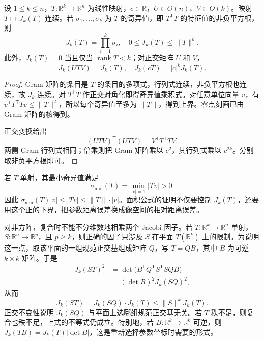 \begin{proposition}\label{b1:prop:linear-jacobian-properties}
设 \(1\le k\le n\)，\(T:\mathbb R^k\to\mathbb R^n\) 为线性映射，\(c\in\mathbb R\)，\(U\in O(n)\)、\(V\in O(k)\)。映射 \(T\mapsto J_k(T)\) 连续。若 \(\sigma_1,\ldots,\sigma_k\) 为 \(T\) 的奇异值，即 \(T^{\mathsf T}T\) 的特征值的非负平方根，则
\[
 J_k(T)=\prod_{i=1}^k\sigma_i,\quad
 0\leq J_k(T)\leq\|T\|^k.
\]
此外，\(J_k(T)=0\) 当且仅当 \(\operatorname{rank}T<k\)；对正交矩阵 \(U\) 和 \(V\)，
\[
 J_k(UTV)=J_k(T),\quad J_k(cT)=|c|^kJ_k(T).
\]
\end{proposition}
\begin{proof}
Gram 矩阵的条目是 \(T\) 的条目的多项式，行列式连续，非负平方根也连续，故 \(J_k\) 连续。对 \(T^{\mathsf T}T\) 作正交对角化即得奇异值乘积式。对任意单位向量 \(v\)，有 \(v^{\mathsf T}T^{\mathsf T}Tv\leq\|T\|^2\)，所以每个奇异值至多为 \(\|T\|\)，得到上界。零点刻画已由 Gram 矩阵的核得到。

正交变换给出
\[
 (UTV)^{\mathsf T}(UTV)=V^{\mathsf T}T^{\mathsf T}TV.
\]
两侧 Gram 行列式相同；倍乘则把 Gram 矩阵乘以 \(c^2\)，其行列式乘以 \(c^{2k}\)。分别取非负平方根即可。
\end{proof}

若 \(T\) 单射，其最小奇异值满足
\[
 \sigma_{\min}(T)=\min_{|v|=1}|Tv|>0.
\]
因此 \(\sigma_{\min}(T)|v|\leq|Tv|\leq\|T\|\cdot|v|\)。面积公式的证明不仅要控制 \(J_k(T)\)，还要用这个正的下界，把参数距离误差换成像空间的相对距离误差。

\ProseParagraphBreak

对非方阵，复合时不能不分维数地相乘两个 Jacobi 因子。若 \(T:\mathbb R^k\to\mathbb R^n\) 单射，\(S:\mathbb R^n\to\mathbb R^p\)，且 \(p\geq k\)，则正确的因子只涉及 \(S\) 在平面 \(T(\mathbb R^k)\) 上的限制。为说明这一点，取该平面的一组规范正交基组成矩阵 \(Q\)，写 \(T=QB\)，其中 \(B\) 为可逆 \(k\times k\) 矩阵。于是
\[
 \begin{aligned}
 J_k(ST)^2
 &=\det\bigl(B^{\mathsf T}Q^{\mathsf T}S^{\mathsf T}SQB\bigr)\\
 &=(\det B)^2J_k(SQ)^2,
 \end{aligned}
\]
从而
\begin{equation}\label{b1:eq:linear-jacobian-composition}
 J_k(ST)=J_k(SQ)\cdot J_k(T)
 \leq\|S\|^kJ_k(T).
\end{equation}
正交不变性说明 \(J_k(SQ)\) 与平面上选哪组规范正交基无关。若 \(T\) 秩不足，则复合也秩不足，上式的不等式仍成立。特别地，若 \(B:\mathbb R^k\to\mathbb R^k\) 可逆，则 \(J_k(TB)=J_k(T)|\det B|\)，这是重新选择参数坐标时需要的形式。

